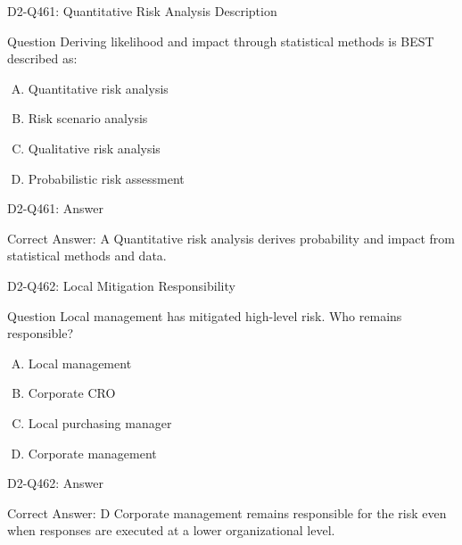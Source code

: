 \documentclass{beamer}
\begin{document}
\begin{frame}{D2-Q461: Quantitative Risk Analysis Description}
	\begin{block}{Question}
		Deriving likelihood and impact through statistical methods is BEST described as:
	\end{block}
	\begin{enumerate}[(A)]
		\item Quantitative risk analysis
		\item Risk scenario analysis
		\item Qualitative risk analysis
		\item Probabilistic risk assessment
	\end{enumerate}
\end{frame}
\begin{frame}{D2-Q461: Answer}
	\begin{block}{Correct Answer: A}
		Quantitative risk analysis derives probability and impact from statistical methods and data.
	\end{block}
\end{frame}

\begin{frame}{D2-Q462: Local Mitigation Responsibility}
	\begin{block}{Question}
		Local management has mitigated high-level risk. Who remains responsible?
	\end{block}
	\begin{enumerate}[(A)]
		\item Local management
		\item Corporate CRO
		\item Local purchasing manager
		\item Corporate management
	\end{enumerate}
\end{frame}
\begin{frame}{D2-Q462: Answer}
	\begin{block}{Correct Answer: D}
		Corporate management remains responsible for the risk even when responses are executed at a lower organizational level.
	\end{block}
\end{frame}
\end{document}
